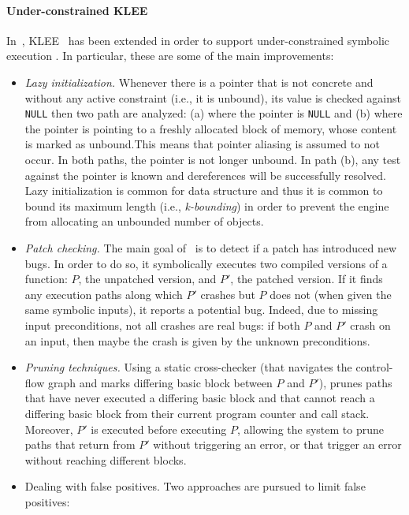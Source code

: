 \paragraph{Under-constrained KLEE} In~\cite{UCKLEE-USEC15}, KLEE~\cite{KLEE-OSDI08} has been extended in order to support under-constrained symbolic execution . In particular, these are some of the main improvements:
\begin{itemize}
  \item {\em Lazy initialization.} Whenever there is a pointer that is not concrete and without any active constraint (i.e., it is unbound), its value is checked against {\tt NULL} then two path are analyzed: (a) where the pointer is {\tt NULL} and (b) where the pointer is pointing to a freshly allocated block of memory, whose content is marked as unbound.This means that pointer aliasing is assumed to not occur. In both paths, the pointer is not longer unbound.  In path (b), any test against the pointer is known and dereferences will be successfully resolved. Lazy initialization is common for data structure and thus it is common to bound its maximum length (i.e., {\em k-bounding}) in order to prevent the engine from allocating an unbounded number of objects.
  \item {\em Patch checking.} The main goal of~\cite{UCKLEE-USEC15} is to detect if a patch has introduced new bugs. In order to do so, it symbolically executes two compiled versions of a function: $P$, the unpatched version, and $P'$, the patched version. If it finds any execution paths along which $P'$ crashes but $P$ does not (when given the same symbolic inputs), it reports a potential bug. Indeed, due to missing input preconditions, not all crashes are real bugs: if both $P$ and $P'$ crash on an input, then maybe the crash is given by the unknown preconditions. 
  \item {\em Pruning techniques.} Using a static cross-checker (that navigates the control-flow graph and marks differing basic block between $P$ and $P'$), \cite{UCKLEE-USEC15} prunes paths that have never executed a differing basic block and that cannot reach a differing basic block from their current program counter and call stack. Moreover, $P'$ is executed before executing $P$, allowing the system to prune paths that return from $P'$ without triggering an error, or that trigger an error without reaching different blocks.
  \item {Dealing with false positives.} Two approaches are pursued to limit false positives:
    \begin{itemize}

\end{itemize}
\end{itemize}
